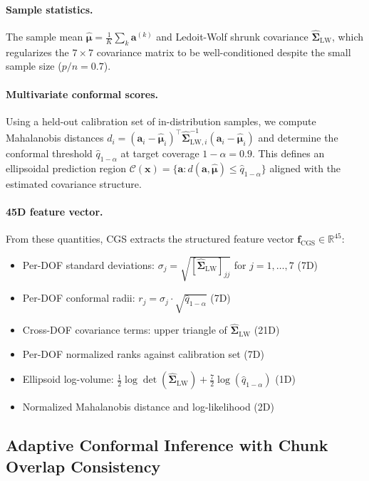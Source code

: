 \documentclass[letterpaper]{article}
\begin{document}
\paragraph{Sample statistics.}
The sample mean $\hat{\boldsymbol{\mu}} = \frac{1}{K}\sum_k \mathbf{a}^{(k)}$ and Ledoit-Wolf shrunk covariance $\hat{\boldsymbol{\Sigma}}_{\text{LW}}$, which regularizes the $7 \times 7$ covariance matrix to be well-conditioned despite the small sample size ($p/n = 0.7$).

\paragraph{Multivariate conformal scores.}
Using a held-out calibration set of in-distribution samples, we compute Mahalanobis distances $d_i = (\mathbf{a}_i - \hat{\boldsymbol{\mu}}_i)^\top \hat{\boldsymbol{\Sigma}}_{\text{LW},i}^{-1} (\mathbf{a}_i - \hat{\boldsymbol{\mu}}_i)$ and determine the conformal threshold $\hat{q}_{1-\alpha}$ at target coverage $1{-}\alpha = 0.9$.
This defines an ellipsoidal prediction region $\mathcal{C}(\mathbf{x}) = \{\mathbf{a} : d(\mathbf{a}, \hat{\boldsymbol{\mu}}) \leq \hat{q}_{1-\alpha}\}$ aligned with the estimated covariance structure.

\paragraph{45D feature vector.}
From these quantities, CGS extracts the structured feature vector $\mathbf{f}_{\text{CGS}} \in \mathbb{R}^{45}$:
\begin{itemize}
    \item Per-DOF standard deviations: $\sigma_j = \sqrt{[\hat{\boldsymbol{\Sigma}}_{\text{LW}}]_{jj}}$ for $j=1,\ldots,7$ (7D)
    \item Per-DOF conformal radii: $r_j = \sigma_j \cdot \sqrt{\hat{q}_{1-\alpha}}$ (7D)
    \item Cross-DOF covariance terms: upper triangle of $\hat{\boldsymbol{\Sigma}}_{\text{LW}}$ (21D)
    \item Per-DOF normalized ranks against calibration set (7D)
    \item Ellipsoid log-volume: $\frac{1}{2}\log\det(\hat{\boldsymbol{\Sigma}}_{\text{LW}}) + \frac{7}{2}\log(\hat{q}_{1-\alpha})$ (1D)
    \item Normalized Mahalanobis distance and log-likelihood (2D)
\end{itemize}

\subsection{Adaptive Conformal Inference with Chunk Overlap Consistency}
\label{sec:aci}
\end{document}
